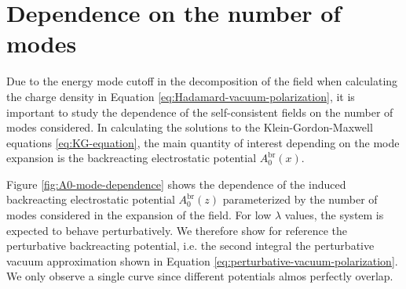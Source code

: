 \chapter{Dependence on the number of modes}

Due to the energy mode cutoff in the decomposition of the field when calculating the charge density in Equation \eqref{eq:Hadamard-vacuum-polarization}, it is important to study the dependence of the self-consistent fields on the number of modes considered. In calculating the solutions to the Klein-Gordon-Maxwell equations \eqref{eq:KG-equation}, the main quantity of interest depending on the mode expansion is the backreacting electrostatic potential $A_0^\text{br}(x)$. 

Figure \ref{fig:A0-mode-dependence} shows the dependence of the induced backreacting electrostatic potential $A_0^\text{br}(z)$ parameterized by the number of modes considered in the expansion of the field. 
For low $\lambda$ values, the system is expected to behave perturbatively. We therefore show for reference the perturbative backreacting potential, i.e. the second integral the perturbative vacuum approximation shown in Equation \eqref{eq:perturbative-vacuum-polarization}. We only observe a single curve since different potentials almos perfectly overlap. 


